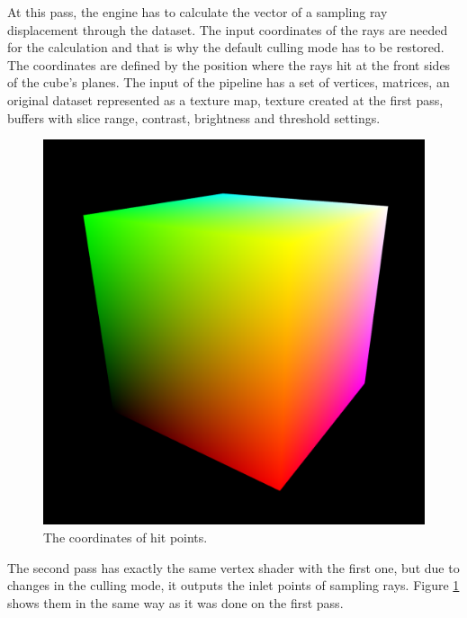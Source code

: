\documentclass[twoside, english, 11pt]{report}
\begin{document}
At this pass, the engine has to calculate the vector of a sampling ray displacement through the dataset. The input coordinates of the rays are needed for the calculation and that is why the default culling mode has to be restored. The coordinates are defined by the position where the rays hit at the front sides of the cube's planes. The input of the pipeline has a set of vertices, matrices, an original dataset represented as a texture map, texture created at the first pass, buffers with slice range, contrast, brightness and threshold settings.\\
\begin{figure}[!h]
\centerline{\includegraphics[scale = 0.3]{img/second}}
\caption{The coordinates of hit points.\label{fig:second}}
\end{figure}

The second pass has exactly the same vertex shader with the first one, but due to changes in the culling mode, it outputs the inlet points of sampling rays. Figure \ref{fig:second} shows them in the same way as it was done on the first pass.\\
\end{document}
